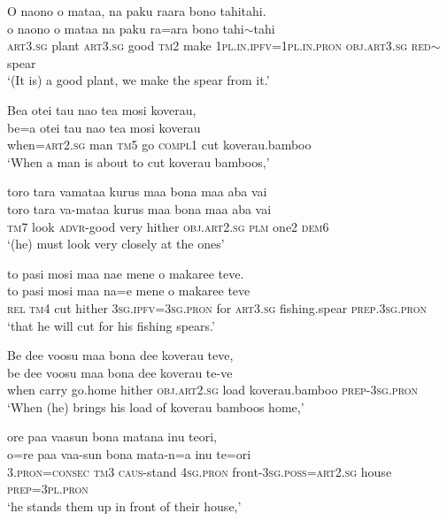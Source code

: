 \ea\label{ex:text6-7}
O naono o mataa, na paku raara bono tahitahi.\\
\gll o	naono	o	mataa	na	paku	ra=ara	bono	tahi{$\sim$}tahi\\
     \textsc{art}3.\textsc{sg}	plant	\textsc{art}3.\textsc{sg}	good	\textsc{tm}2	make	1\textsc{pl}.\textsc{in}.\textsc{ipfv}=1\textsc{pl}.\textsc{in}.\textsc{pron}	\textsc{obj}.\textsc{art}3.\textsc{sg}	\textsc{red}{$\sim$}spear\\
\glt `(It is) a good plant, we make the spear from it.'
\z

\ea\label{ex:text6-8}
Bea otei tau nao tea mosi koverau,\\
\gll be=a	otei	tau	nao	tea	mosi	koverau\\
     when=\textsc{art}2.\textsc{sg}	man	\textsc{tm}5	go	\textsc{compl}1	cut	koverau.bamboo\\
\glt `When a man is about to cut koverau bamboos,'
\z

\ea\label{ex:text6-9}
toro tara vamataa kurus maa bona maa aba vai\\
\gll toro	tara	va-mataa	kurus	maa	bona	maa	aba	vai\\
     \textsc{tm}7	look	\textsc{advr}-good	very	hither	\textsc{obj}.\textsc{art}2.\textsc{sg}	\textsc{plm}	one2	\textsc{dem}6\\
\glt `(he) must look very closely at the ones'
\z

\ea\label{ex:text6-10}
to pasi mosi maa nae mene o makaree teve.\\
\gll to	pasi	mosi	maa	na=e	mene	o	makaree	teve\\
     \textsc{rel}	\textsc{tm}4	cut	hither	3\textsc{sg}.\textsc{ipfv}=3\textsc{sg}.\textsc{pron}	for	\textsc{art}3.\textsc{sg}	fishing.spear	\textsc{prep}.3\textsc{sg}.\textsc{pron}\\
\glt `that he will cut for his fishing spears.'
\z

\ea\label{ex:text6-11}
Be dee voosu maa bona dee koverau teve,\\
\gll be	dee	voosu	maa	bona	dee	koverau	te-ve\\
     when	carry	go.home	hither	\textsc{obj}.\textsc{art}2.\textsc{sg}	load	koverau.bamboo	\textsc{prep}-3\textsc{sg}.\textsc{pron}\\
\glt `When (he) brings his load of koverau bamboos home,'
\z

\ea\label{ex:text6-12}
ore paa vaasun bona matana inu teori,\\
\gll o=re	paa	vaa-sun	bona	mata-n=a	inu	te=ori\\
     3.\textsc{pron}=\textsc{consec}	\textsc{tm}3	\textsc{caus}-stand	4\textsc{sg}.\textsc{pron}	front-3\textsc{sg}.\textsc{poss}=\textsc{art}2.\textsc{sg}	house	\textsc{prep}=3\textsc{pl}.\textsc{pron}\\
\glt `he stands them up in front of their house,'
\z

